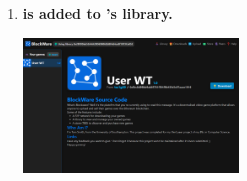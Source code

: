 \begin{enumerate}[itemsep=2.5pt]
  \item \textbf{ is added to 's library.}
  
  \includegraphics[width=0.45\textwidth]{assets/images/user-walkthrough/1/library-entry.png}
\end{enumerate}
